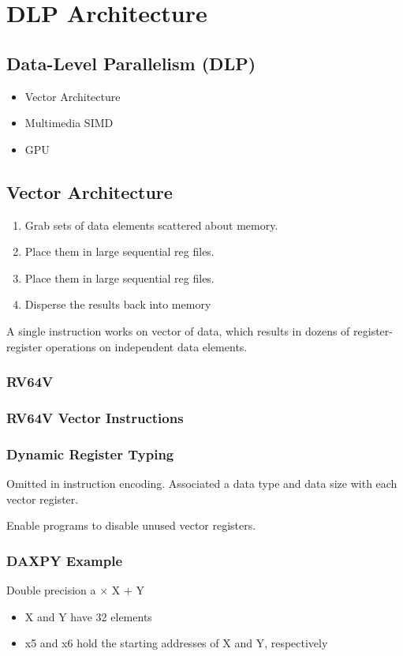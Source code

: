 \newpage
\section{DLP Architecture}%
\subsection{Data-Level Parallelism (DLP)}
\begin{itemize}
    \item Vector Architecture
    \item Multimedia SIMD
    \item GPU
\end{itemize}

\subsection{Vector Architecture}
\begin{enumerate}
    \item Grab sets of data elements scattered about memory. 
    \item Place them in large sequential reg files. 
    \item Place them in large sequential reg files. 
    \item Disperse the results back into memory
\end{enumerate}

A single instruction works on vector of data, which results in dozens of register-register operations on independent data elements. 


\subsubsection{RV64V}


\subsubsection{RV64V Vector Instructions}

\subsubsection{Dynamic Register Typing}
Omitted in instruction encoding. Associated a data type and data size with each vector register. 


Enable programs to disable unused vector registers. 

\subsubsection{DAXPY Example}
Double precision a $\times$ X $+$ Y
\begin{itemize}
    \item X and Y have 32 elements
    \item x5 and x6 hold the starting addresses
    of X and Y, respectively
\end{itemize}

